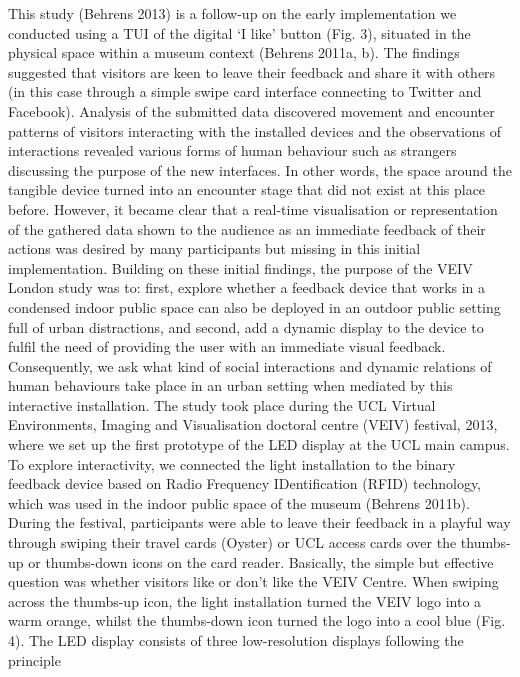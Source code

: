 This study \cite{Behrens2013} (Behrens 2013) is a follow-up on the early implementation we conducted using a TUI of the digital ‘I like’ button (Fig. 3), situated in the physical space within a museum context \cite{Behrens2011} \cite{Behrens2011} (Behrens 2011a, b). The findings suggested that visitors are keen to leave their feedback and share it with others (in this case through a simple swipe card interface connecting to Twitter and Facebook).
Analysis of the submitted data discovered movement and encounter patterns of
visitors interacting with the installed devices and the observations of interactions
revealed various forms of human behaviour such as strangers discussing the purpose
of the new interfaces. In other words, the space around the tangible device
turned into an encounter stage that did not exist at this place before. However, it
became clear that a real-time visualisation or representation of the gathered data
shown to the audience as an immediate feedback of their actions was desired by
many participants but missing in this initial implementation.
Building on these initial findings, the purpose of the VEIV London study was
to: first, explore whether a feedback device that works in a condensed indoor
public space can also be deployed in an outdoor public setting full of urban distractions,
and second, add a dynamic display to the device to fulfil the need of
providing the user with an immediate visual feedback. Consequently, we ask what
kind of social interactions and dynamic relations of human behaviours take place
in an urban setting when mediated by this interactive installation.
The study took place during the UCL Virtual Environments, Imaging and
Visualisation doctoral centre (VEIV) festival, 2013, where we set up the first
prototype of the LED display at the UCL main campus. To explore interactivity,
we connected the light installation to the binary feedback device based on Radio
Frequency IDentification (RFID) technology, which was used in the indoor public
space of the museum \cite{Behrens2011} (Behrens 2011b). During the festival, participants were able to leave their feedback in a playful way through swiping their travel cards (Oyster)
or UCL access cards over the thumbs-up or thumbs-down icons on the card reader.
Basically, the simple but effective question was whether visitors like or don’t like
the VEIV Centre. When swiping across the thumbs-up icon, the light installation
turned the VEIV logo into a warm orange, whilst the thumbs-down icon turned the
logo into a cool blue (Fig. 4).
The LED display consists of three low-resolution displays following the principle

